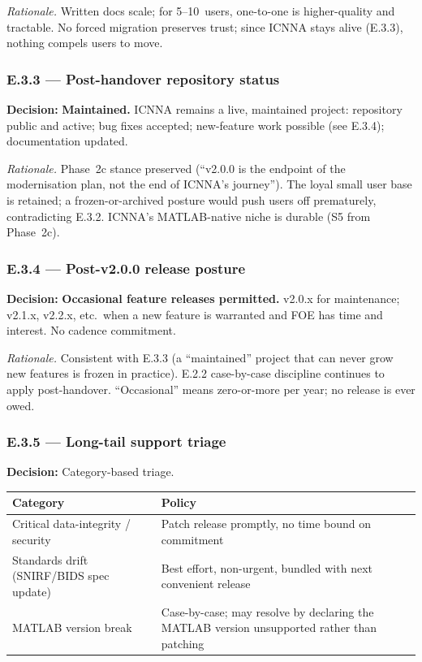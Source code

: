 \documentclass[11pt,a4paper]{article}
\begin{document}
\textit{Rationale.} Written docs scale; for 5--10~users, one-to-one is higher-quality and tractable. No forced migration preserves trust; since ICNNA stays alive (E.3.3), nothing compels users to move.

\subsubsection{E.3.3 --- Post-handover repository status}

\textbf{Decision:} \textbf{Maintained.} ICNNA remains a live, maintained project: repository public and active; bug fixes accepted; new-feature work possible (see E.3.4); documentation updated.

\textit{Rationale.} Phase~2c stance preserved (``v2.0.0 is the endpoint of the modernisation plan, not the end of ICNNA's journey''). The loyal small user base is retained; a frozen-or-archived posture would push users off prematurely, contradicting E.3.2. ICNNA's MATLAB-native niche is durable (S5 from Phase~2c).

\subsubsection{E.3.4 --- Post-v2.0.0 release posture}

\textbf{Decision:} \textbf{Occasional feature releases permitted.} v2.0.x for maintenance; v2.1.x, v2.2.x, etc.\ when a new feature is warranted and FOE has time and interest. No cadence commitment.

\textit{Rationale.} Consistent with E.3.3 (a ``maintained'' project that can never grow new features is frozen in practice). E.2.2 case-by-case discipline continues to apply post-handover. ``Occasional'' means zero-or-more per year; no release is ever owed.

\subsubsection{E.3.5 --- Long-tail support triage}

\textbf{Decision:} Category-based triage.

\begin{table}[h]
\centering
\small
\begin{tabular}{p{5cm}p{8cm}}
\toprule
\textbf{Category} & \textbf{Policy} \\
\midrule
Critical data-integrity / security & Patch release promptly, no time bound on commitment \\
Standards drift (SNIRF/BIDS spec update) & Best effort, non-urgent, bundled with next convenient release \\
MATLAB version break & Case-by-case; may resolve by declaring the MATLAB version unsupported rather than patching \\
\bottomrule
\end{tabular}
\end{table}
\end{document}
